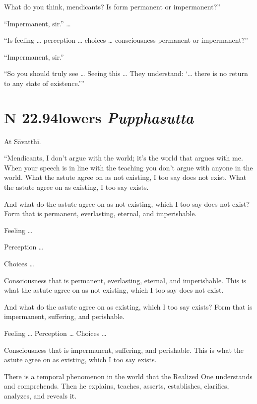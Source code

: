 \documentclass[12pt,openany]{book}%
\newcommand*{\suttatitleacronym}[1]{\smaller[2]{#1}\vspace*{.3em}}
\newcommand*{\suttatitletranslation}[1]{\linebreak{#1}}
\newcommand*{\suttatitleroot}[1]{\linebreak\smaller[2]\itshape{#1}}
\newcommand*{\tocacronym}[1]{\hspace*{-3.3em}{#1}\quad}
\newcommand*{\toctranslation}[1]{#1}
\newcommand*{\tocroot}[1]{(\textit{#1})}
\begin{document}
What do you think, mendicants? Is form permanent or impermanent?” 

“Impermanent, sir.” … 

“Is feeling … perception … choices … consciousness permanent or impermanent?” 

“Impermanent, sir.” 

“So you should truly see … Seeing this … They understand: ‘… there is no return to any state of existence.’” 

%
\section*{{\suttatitleacronym SN 22.94}{\suttatitletranslation Flowers }{\suttatitleroot Pupphasutta}}
\addcontentsline{toc}{section}{\tocacronym{SN 22.94} \toctranslation{Flowers } \tocroot{Pupphasutta}}

At \textsanskrit{Sāvatthī}. 

“Mendicants, I don’t argue with the world; it’s the world that argues with me. When your speech is in line with the teaching you don’t argue with anyone in the world. What the astute agree on as not existing, I too say does not exist. What the astute agree on as existing, I too say exists. 

And what do the astute agree on as not existing, which I too say does not exist? Form that is permanent, everlasting, eternal, and imperishable. 

Feeling … 

Perception … 

Choices … 

Consciousness that is permanent, everlasting, eternal, and imperishable. This is what the astute agree on as not existing, which I too say does not exist. 

And what do the astute agree on as existing, which I too say exists? Form that is impermanent, suffering, and perishable. 

Feeling … Perception … Choices … 

Consciousness that is impermanent, suffering, and perishable. This is what the astute agree on as existing, which I too say exists. 

There is a temporal phenomenon in the world that the Realized One understands and comprehends. Then he explains, teaches, asserts, establishes, clarifies, analyzes, and reveals it. 
\end{document}
